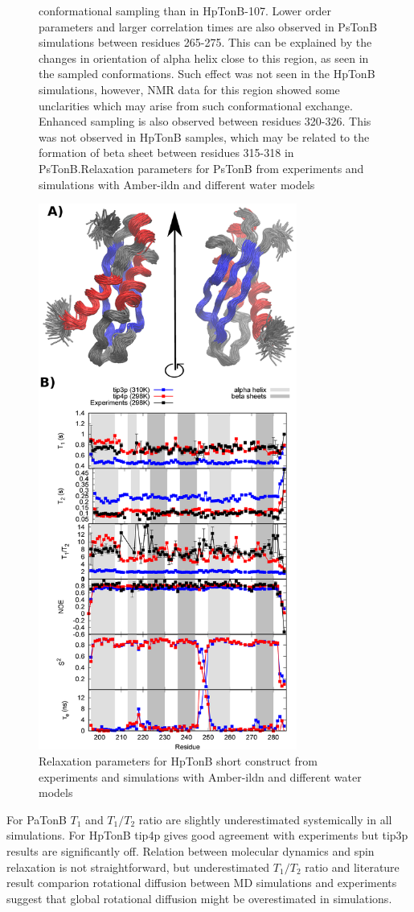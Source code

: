 \documentclass[pre,aps,floatfix,authordate1-4,twocolumn]{revtex4-1}
\begin{document}
\begin{figure}[!h]
{    conformational sampling than in HpTonB-107. Lower order parameters and larger
    correlation times are also observed in PsTonB simulations between residues 265-275.
    This can be explained by the changes in orientation of alpha helix close to this
    region, as seen in the sampled conformations. Such effect was not seen in the HpTonB
    simulations, however, NMR data for this region showed some unclarities which may arise
    from such conformational exchange. Enhanced sampling is also observed between
    residues 320-326. This was not observed in HpTonB samples, which may be related to the
    formation of beta sheet between residues 315-318 in PsTonB.Relaxation parameters for PsTonB from
    experiments and simulations with Amber-ildn and different water models
    \label{PsTonBrelaxationDATA}}%
\end{figure}
\begin{figure}[!h]
  \includegraphics[width=8.5cm]{../Figs/RELdataHpTonB.eps}%
  \caption{Relaxation parameters for HpTonB short construct from
    experiments and simulations with Amber-ildn and different water models
    \label{HpTonBrelaxationDATA}}%
\end{figure}
For PaTonB $T_1$ and $T_1/T_2$ ratio are slightly  underestimated  systemically in all simulations.
For HpTonB tip4p gives good agreement with experiments but tip3p results are
significantly off. Relation between molecular dynamics and spin relaxation is
not straightforward, but underestimated $T_1/T_2$ ratio and literature result
comparion rotational diffusion between MD simulations \cite{??} and experiments
suggest that global rotational diffusion might be overestimated in simulations.
\end{document}
